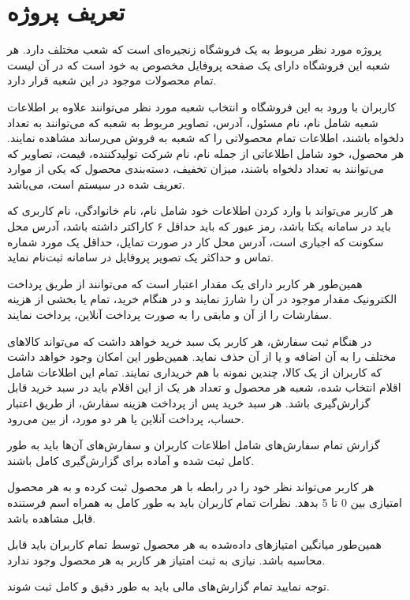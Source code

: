 \documentclass[12pt,a4paper]{article}
\begin{document}
\section{تعریف پروژه}
پروژه مورد نظر مربوط به یک فروشگاه زنجیره‌ای است که شعب مختلف دارد. هر شعبه این فروشگاه دارای یک صفحه پروفایل مخصوص به خود است که در آن لیست تمام محصولات موجود در این شعبه قرار دارد. 
\par
کاربران با ورود به این فروشگاه و انتخاب شعبه مورد نظر می‌توانند علاوه بر اطلاعات شعبه شامل نام، نام مسئول، آدرس، تصاویر مربوط به شعبه که می‌توانند به تعداد دلخواه باشند، اطلاعات تمام محصولاتی را که شعبه به فروش می‌رساند مشاهده نمایند. هر محصول، خود شامل اطلاعاتی از جمله نام، نام شرکت تولیدکننده، قیمت، تصاویر که می‌توانند به تعداد دلخواه باشند، میزان تخفیف، دسته‌بندی محصول که یکی از موارد تعریف شده در سیستم است، می‌باشد.
\par
هر کاربر می‌تواند با وارد کردن اطلاعات خود شامل نام،‌ نام خانوادگی، نام کاربری که باید در سامانه یکتا باشد، رمز عبور که باید حداقل ۶ کاراکتر داشته باشد، آدرس محل سکونت که اجباری است، آدرس محل کار در صورت تمایل، حداقل یک مورد شماره تماس و حداکثر یک تصویر پروفایل در سامانه ثبت‌نام نماید. 
\par
همین‌طور هر کاربر دارای یک مقدار اعتبار است که می‌توانند از طریق پرداخت الکترونیک مقدار موجود در آن را شارژ نمایند و در هنگام خرید، تمام یا بخشی از هزینه سفارشات را از آن و مابقی را به صورت پرداخت آنلاین، پرداخت نمایند.
\par
در هنگام ثبت سفارش، هر کاربر یک سبد خرید خواهد داشت که می‌تواند کالاهای مختلف را به آن اضافه و یا از آن حذف نماید. همین‌طور این امکان وجود خواهد داشت که کاربران از یک کالا، چندین نمونه با هم خریداری نمایند. تمام این اطلاعات شامل اقلام انتخاب شده، شعبه هر محصول و تعداد هر یک از این اقلام باید در سبد خرید قابل گزارش‌گیری باشد. هر سبد خرید پس از پرداخت هزینه سفارش، از طریق اعتبار حساب، پرداخت آنلاین یا هر دو مورد، از بین می‌رود.
\par
گزارش تمام سفارش‌های شامل اطلاعات کاربران و سفارش‌های آن‌ها باید به طور کامل ثبت شده و آماده برای گزارش‌گیری کامل باشند.
\par
هر کاربر می‌تواند نظر خود را در رابطه با هر محصول ثبت کرده و به هر محصول امتیازی بین 0 تا 5 بدهد. نظرات تمام کاربران باید به طور کامل به همراه اسم فرستنده قابل مشاهده باشد.
\par
همین‌طور میانگین امتیازهای داده‌شده به هر محصول توسط تمام کاربران باید قابل محاسبه باشد. نیازی به ثبت امتیاز هر کاربر به هر محصول وجود ندارد.
\par
توجه نمایید تمام گزارش‌های مالی باید به طور دقیق و کامل ثبت شوند.
\par
\end{document}

